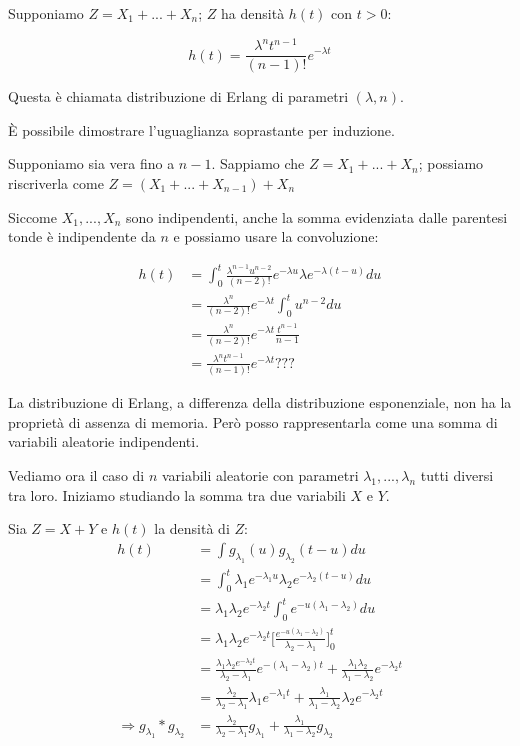 \documentclass[a4paper,12pt]{book}
\begin{document}
Supponiamo $ Z = X_1 + ... + X_n $; $ Z $ ha densità $ h(t) $ con $ t > 0 $:

$$ h(t) = \frac{\lambda^n t^{n-1}}{(n-1)!} e^{-\lambda t} $$

Questa è chiamata distribuzione di Erlang di parametri $ (\lambda, n) $.

È possibile dimostrare l'uguaglianza soprastante per induzione. 

Supponiamo sia vera fino a $ n-1 $. Sappiamo che $ Z = X_1 + ... + X_n $; possiamo riscriverla come 
$ Z = (X_1 + ... + X_{n-1}) + X_n $

Siccome $ X_1, ..., X_n $ sono indipendenti, anche la somma evidenziata dalle parentesi tonde è indipendente da $ n $ e possiamo usare la convoluzione:

\begin{align*}
	h(t) & = \int_{0}^{t}\frac{\lambda^{n-1} u^{n-2}}{(n-2)!} e^{-\lambda u} \lambda e^{-\lambda(t-u)} du \\
	& = \frac{\lambda^n}{(n-2)!}e^{-\lambda t} \int_{0}^{t} u^{n-2} du \\
	& = \frac{\lambda^n}{(n-2)!} e^{-\lambda t} \frac{t^{n-1}}{n-1} \\
	& = \frac{\lambda^n t^{n-1}}{(n-1)!} e^{-\lambda t} ??? %
\end{align*}

La distribuzione di Erlang, a differenza della distribuzione esponenziale, non ha la proprietà di assenza di memoria. Però posso rappresentarla come una somma di variabili aleatorie indipendenti. 

Vediamo ora il caso di $ n $ variabili aleatorie con parametri $ \lambda_1, ..., \lambda_n $ tutti diversi tra loro. Iniziamo studiando la somma tra due variabili $ X $ e $ Y $.

Sia $ Z = X + Y $ e $ h(t) $ la densità di $ Z $:
\begin{align*}
	h(t) & = \int g_{\lambda_1}(u) g_{\lambda_2}(t-u) du \\ %
	& = \int_{0}^{t} \lambda_1e^{-\lambda_1 u} \lambda_2e^{-\lambda_2(t-u)} du \\
	& = \lambda_1\lambda_2e^{-\lambda_2 t} \int_{0}^{t}e^{-u(\lambda_1-\lambda_2)} du \\
	& = \lambda_1\lambda_2e^{-\lambda_2 t} \bigg[\frac{e^{-u(\lambda_1-\lambda_2)}}{\lambda_2 - 
		\lambda_1}\bigg]^{t}_0 \\
	& = \frac{\lambda_1\lambda_2 e^{-\lambda_2 t}}{\lambda_2 - \lambda_1}e^{-(\lambda_1 - \lambda_2)t} + \frac{\lambda_1\lambda_2}{\lambda_1-\lambda_2}e^{-\lambda_2 t} \\
	& = \frac{\lambda_2}{\lambda_2 - \lambda_1} \lambda_1 e^{-\lambda_1 t} + \frac{\lambda_1}{\lambda_1 - \lambda_2}\lambda_2 e^{-\lambda_2t} \\
	\Rightarrow g_{\lambda_1} * g_{\lambda_2} & = \frac{\lambda_2}{\lambda_2 - \lambda_1} g_{\lambda_1} + \frac{\lambda_1}{\lambda_1-\lambda_2}g_{\lambda_2} %
\end{align*}
\end{document}
